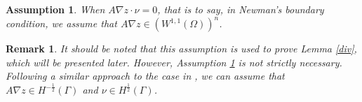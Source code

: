 \documentclass[9pt,reqno]{amsart}
\theoremstyle{plain}
\newtheorem{lemma}[theorem]{Lemma}
\newtheorem{assumption}[theorem]{Assumption}
\newtheorem{remark}[theorem]{Remark}
\numberwithin{equation}{section}
\numberwithin{theorem}{section}
\def\Om{\Omega}
\DeclareMathOperator*{\Div}{\mathrm{div}}
\def\Om{\Omega}
\def\mcH{\mathcal{H}}
\begin{document}
	\begin{assumption}\label{assume2}
		When $A\nabla z \cdot \nu =0$, that is to say, in Newman's boundary condition, we assume that $A\nabla z \in (W^{1,1}(\Om))^n$.
	\end{assumption}
	\begin{remark}
		It should be noted that this assumption is used to prove Lemma \ref{div}, which will be presented later. However, Assumption \ref{assume2} is not strictly necessary. Following a similar approach to the case in \cite{BSV}, we can assume that $A\nabla z \in H^{-\frac{1}{2}}(\Gamma)$ and $\nu \in H^{\frac{1}{2}}(\Gamma)$.
	\end{remark}
\end{document}
